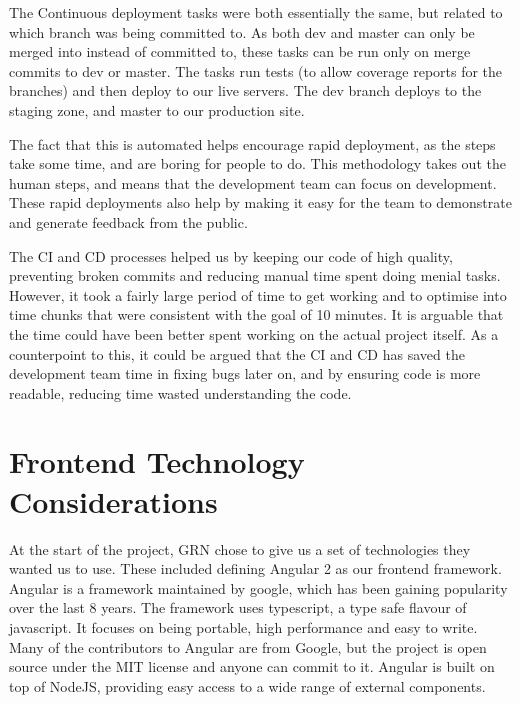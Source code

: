 \documentclass{l3proj}
\begin{document}
 

The Continuous deployment tasks were both essentially the same, but related to which branch was being 
 committed to. As both dev and master can only be merged into instead of committed to, these tasks can 
 be run only on merge commits to dev or master. The tasks run tests (to allow coverage reports for the branches) 
 and then deploy to our live servers. The dev branch deploys to the staging zone, and 
 master to our production site. 
 
The fact that this is automated helps encourage rapid deployment, as the steps take some time, and are 
 boring for people to do. This methodology takes out the human steps, and means that the development team 
 can focus on development. These rapid deployments also help by making it easy for the team to demonstrate 
 and generate feedback from the public.


The CI and CD processes helped us by keeping our code of high quality, preventing broken commits and reducing 
 manual time spent doing menial tasks. However, it took a fairly large period of time to get working and to
 optimise into time chunks that were consistent with the goal of 10 minutes. It is arguable that the time 
 could have been better spent working on the actual project itself. As a counterpoint to this, it could be
 argued that the CI and CD has saved the development team time in fixing bugs later on, and by ensuring code is more
 readable, reducing time wasted understanding the code.

\newpage
\section{Frontend Technology Considerations}
\label{sec:frontend}

At the start of the project, GRN chose to give us a set of technologies they 
 wanted us to use. These included defining Angular 2 as our frontend framework.
 Angular is a framework maintained by google, which has been gaining popularity
 over the last 8 years\cite{angularjsoverview}. The framework uses typescript, 
 a type safe flavour of javascript. It focuses on being portable, high performance
 and easy to write\cite{angular_features}. Many of the contributors to Angular are from Google, but 
 the project is open source under the MIT license and anyone can commit to 
 it\cite{angularjsoverview}. Angular is built on top of NodeJS, providing 
 easy access to a wide range of external components.
 
\end{document}
